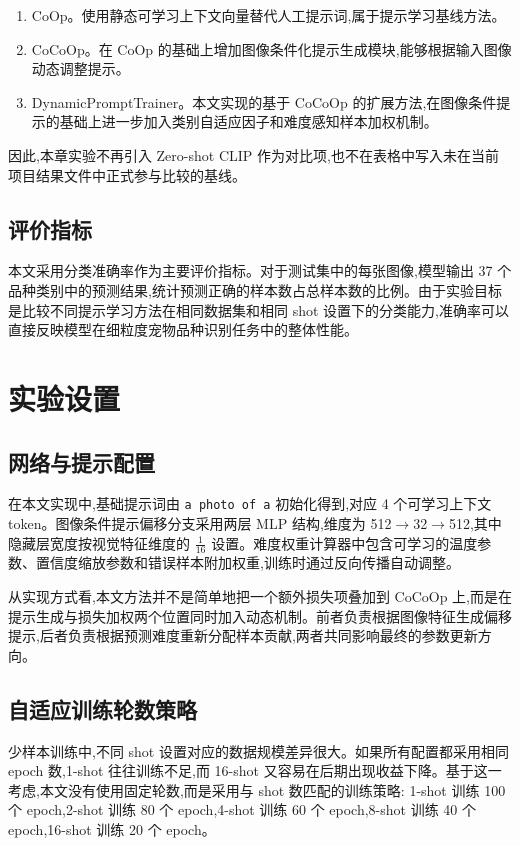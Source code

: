 \begin{enumerate}
\item CoOp。使用静态可学习上下文向量替代人工提示词,属于提示学习基线方法。
\item CoCoOp。在 CoOp 的基础上增加图像条件化提示生成模块,能够根据输入图像动态调整提示。
\item DynamicPromptTrainer。本文实现的基于 CoCoOp 的扩展方法,在图像条件提示的基础上进一步加入类别自适应因子和难度感知样本加权机制。
\end{enumerate}

因此,本章实验不再引入 Zero-shot CLIP 作为对比项,也不在表格中写入未在当前项目结果文件中正式参与比较的基线。

\subsection{评价指标}

本文采用分类准确率作为主要评价指标。对于测试集中的每张图像,模型输出 37 个品种类别中的预测结果,统计预测正确的样本数占总样本数的比例。由于实验目标是比较不同提示学习方法在相同数据集和相同 shot 设置下的分类能力,准确率可以直接反映模型在细粒度宠物品种识别任务中的整体性能。

\section{实验设置}

\subsection{网络与提示配置}

在本文实现中,基础提示词由 \texttt{a photo of a} 初始化得到,对应 4 个可学习上下文 token。图像条件提示偏移分支采用两层 MLP 结构,维度为 512$\rightarrow$32$\rightarrow$512,其中隐藏层宽度按视觉特征维度的 $\frac{1}{16}$ 设置。难度权重计算器中包含可学习的温度参数、置信度缩放参数和错误样本附加权重,训练时通过反向传播自动调整。

从实现方式看,本文方法并不是简单地把一个额外损失项叠加到 CoCoOp 上,而是在提示生成与损失加权两个位置同时加入动态机制。前者负责根据图像特征生成偏移提示,后者负责根据预测难度重新分配样本贡献,两者共同影响最终的参数更新方向。

\subsection{自适应训练轮数策略}

少样本训练中,不同 shot 设置对应的数据规模差异很大。如果所有配置都采用相同 epoch 数,1-shot 往往训练不足,而 16-shot 又容易在后期出现收益下降。基于这一考虑,本文没有使用固定轮数,而是采用与 shot 数匹配的训练策略: 1-shot 训练 100 个 epoch,2-shot 训练 80 个 epoch,4-shot 训练 60 个 epoch,8-shot 训练 40 个 epoch,16-shot 训练 20 个 epoch。

